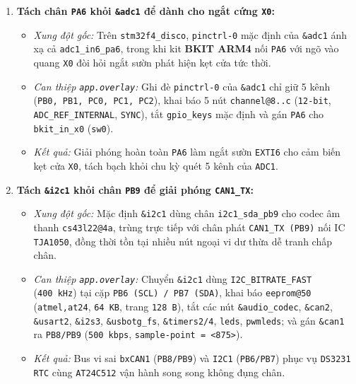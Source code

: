 \begin{enumerate}[nosep]
    \item \textbf{Tách chân \texttt{PA6} khỏi \texttt{\&adc1} để dành cho ngắt cứng \texttt{X0}:}
    \begin{itemize}[nosep]
        \item \textit{Xung đột gốc:} Trên \texttt{stm32f4\_disco}, \texttt{pinctrl-0} mặc định của \texttt{\&adc1} ánh xạ cả \texttt{adc1\_in6\_pa6}, trong khi kit \textbf{BKIT ARM4} nối \texttt{PA6} với ngõ vào quang \texttt{X0} đòi hỏi ngắt sườn phát hiện kẹt cửa tức thời.
        \item \textit{Can thiệp \texttt{app.overlay}:} Ghi đè \texttt{pinctrl-0} của \texttt{\&adc1} chỉ giữ 5 kênh (\texttt{PB0, PB1, PC0, PC1, PC2}), khai báo 5 nút \texttt{channel@8..c} (\texttt{12-bit}, \texttt{ADC\_REF\_INTERNAL}, \texttt{SYNC}), tắt \texttt{gpio\_keys} mặc định và gán \texttt{PA6} cho \texttt{bkit\_in\_x0} (\texttt{sw0}).
        \item \textit{Kết quả:} Giải phóng hoàn toàn \texttt{PA6} làm ngắt sườn \texttt{EXTI6} cho cảm biến kẹt cửa \texttt{X0}, tách bạch khỏi chu kỳ quét 5 kênh của \texttt{ADC1}.
    \end{itemize}
    \item \textbf{Tách \texttt{\&i2c1} khỏi chân \texttt{PB9} để giải phóng \texttt{CAN1\_TX}:}
    \begin{itemize}[nosep]
        \item \textit{Xung đột gốc:} Mặc định \texttt{\&i2c1} dùng chân \texttt{i2c1\_sda\_pb9} cho codec âm thanh \texttt{cs43l22@4a}, trùng trực tiếp với chân phát \texttt{CAN1\_TX (PB9)} nối IC \texttt{TJA1050}, đồng thời tồn tại nhiều nút ngoại vi dư thừa dễ tranh chấp chân.
        \item \textit{Can thiệp \texttt{app.overlay}:} Chuyển \texttt{\&i2c1} dùng \texttt{I2C\_BITRATE\_FAST} (\texttt{400~kHz}) tại cặp \texttt{PB6 (SCL) / PB7 (SDA)}, khai báo \texttt{eeprom@50} (\texttt{atmel,at24}, \texttt{64~KB}, trang \texttt{128~B}), tắt các nút \texttt{\&audio\_codec}, \texttt{\&can2}, \texttt{\&usart2}, \texttt{\&i2s3}, \texttt{\&usbotg\_fs}, \texttt{\&timers2/4}, \texttt{leds}, \texttt{pwmleds}; và gán \texttt{\&can1} ra \texttt{PB8/PB9} (\texttt{500~kbps}, \texttt{sample-point = <875>}).
        \item \textit{Kết quả:} Bus vi sai \texttt{bxCAN1} (\texttt{PB8/PB9}) và \texttt{I2C1} (\texttt{PB6/PB7}) phục vụ \texttt{DS3231 RTC} cùng \texttt{AT24C512} vận hành song song không đụng chân.
    \end{itemize}

\end{enumerate}
